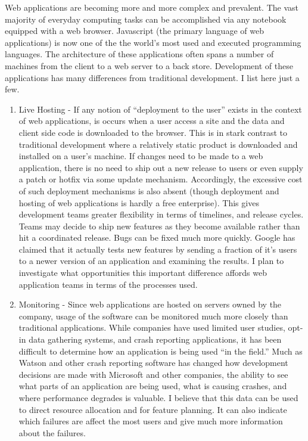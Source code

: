 \documentclass[10pt]{article}
\begin{document}
\begin{small}
\begin{enumerate}
\end{enumerate}

Web applications are becoming more and more complex and prevalent.  The vast
majority
of everyday computing tasks can be accomplished via any notebook
equipped with a web browser.  Javascript (the primary language of web
applications) is now one of the the world's most used and executed programming languages.  The architecture of these applications often spans a number of machines from the client to a web server to a back store.  Development of these applications has many differences from
traditional development.
I list here just a few.

\begin{enumerate}

\item Live Hosting - If any notion of ``deployment to the user'' exists in the context of web applications,
    is occurs when a user access a site and the data and client side code is downloaded to the 
    browser.  This is in stark contrast to traditional development where a relatively static
    product is downloaded and installed on a user's machine.  If changes need to be made to a web
    application, there is no need to ship out a new release to users or even supply a patch or hotfix
    via some update mechanism.  Accordingly, the excessive cost of such deployment mechanisms is also
    absent (though deployment and hosting of web applications is hardly a free enterprise).  This gives
    development teams greater flexibility in terms of timelines, and release cycles.  Teams may decide
    to ship new features as they become available rather than hit a coordinated release.  Bugs can be fixed
    much more quickly.  Google has claimed that it actually tests new features by sending a fraction of it's
    users to a newer version of an application and examining the results.  I plan to investigate
    what opportunities this important difference affords web application teams in terms of the processes
    used.

\item Monitoring - Since web applications are hosted on servers owned by the company, usage of the software
    can be monitored much more closely than traditional applications.  While companies have used limited
    user studies, opt-in data gathering systems, and crash reporting applications, it has been difficult
    to determine how an application is being used ``in the field.'' Much as Watson and other crash
    reporting software has changed how development decisions are made with Microsoft and other companies,
    the ability to see what parts of an application are being used, what is causing crashes, and where
    performance degrades is valuable.  I believe that this data can be used to direct resource allocation and for
    feature planning.  It can also indicate which failures are affect the most users and give much
    more information about the failures.


\end{enumerate}
\end{small}
\end{document}
